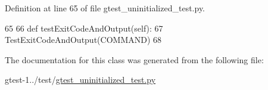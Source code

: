 \-Definition at line 65 of file gtest\-\_\-uninitialized\-\_\-test.\-py.


\begin{DoxyCode}
65 
66   def testExitCodeAndOutput(self):
67     TestExitCodeAndOutput(COMMAND)
68 

\end{DoxyCode}


\-The documentation for this class was generated from the following file\-:\begin{DoxyCompactItemize}
\item 
gtest-\/1../test/\hyperlink{gtest__uninitialized__test_8py}{gtest\-\_\-uninitialized\-\_\-test.\-py}\end{DoxyCompactItemize}
